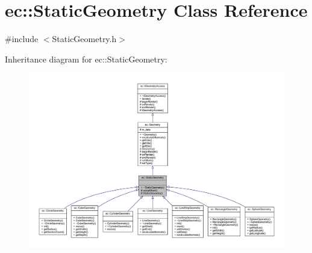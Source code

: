 \hypertarget{classec_1_1_static_geometry}{}\section{ec\+:\+:Static\+Geometry Class Reference}
\label{classec_1_1_static_geometry}


{\ttfamily \#include $<$Static\+Geometry.\+h$>$}



Inheritance diagram for ec\+:\+:Static\+Geometry\+:\nopagebreak
\begin{figure}[H]
\begin{center}
\leavevmode
\includegraphics[width=350pt]{classec_1_1_static_geometry__inherit__graph}
\end{center}
\end{figure}


